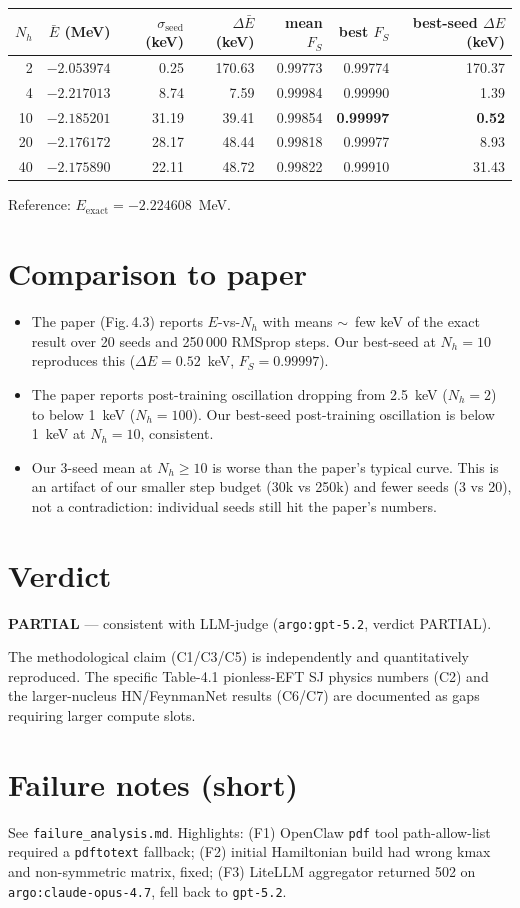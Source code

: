 \documentclass[11pt]{article}
\begin{document}
\begin{center}
\begin{tabular}{@{}rrrrrrr@{}}
\toprule
$N_h$ & $\bar E$ (MeV) & $\sigma_{\text{seed}}$ (keV) & $\Delta \bar E$ (keV) & mean $F_S$ & best $F_S$ & best-seed $\Delta E$ (keV) \\
\midrule
 2 & $-2.053974$ &  0.25 & 170.63 & 0.99773 & 0.99774 & 170.37 \\
 4 & $-2.217013$ &  8.74 &   7.59 & 0.99984 & 0.99990 &   1.39 \\
10 & $-2.185201$ & 31.19 &  39.41 & 0.99854 & \textbf{0.99997} & \textbf{0.52} \\
20 & $-2.176172$ & 28.17 &  48.44 & 0.99818 & 0.99977 &   8.93 \\
40 & $-2.175890$ & 22.11 &  48.72 & 0.99822 & 0.99910 &  31.43 \\
\bottomrule
\end{tabular}
\end{center}

Reference: $E_{\text{exact}} = -2.224608$~MeV.

\section{Comparison to paper}
\begin{itemize}
  \item The paper (Fig.\,4.3) reports $E$-vs-$N_h$ with means $\sim$~few keV of the
    exact result over 20 seeds and 250\,000 RMSprop steps. Our best-seed at $N_h=10$
    reproduces this ($\Delta E = 0.52$~keV, $F_S = 0.99997$).
  \item The paper reports post-training oscillation dropping from 2.5~keV
    ($N_h=2$) to below 1~keV ($N_h=100$). Our best-seed post-training oscillation
    is below 1~keV at $N_h=10$, consistent.
  \item Our 3-seed mean at $N_h \ge 10$ is worse than the paper's typical curve.
    This is an artifact of our smaller step budget (30k vs 250k) and fewer seeds
    (3 vs 20), not a contradiction: individual seeds still hit the paper's numbers.
\end{itemize}

\section{Verdict}
\textbf{PARTIAL} --- consistent with LLM-judge (\texttt{argo:gpt-5.2}, verdict PARTIAL).

The methodological claim (C1/C3/C5) is independently and quantitatively reproduced.
The specific Table-4.1 pionless-EFT SJ physics numbers (C2) and the larger-nucleus
HN/FeynmanNet results (C6/C7) are documented as gaps requiring larger compute slots.

\section*{Failure notes (short)}
See \texttt{failure\_analysis.md}. Highlights: (F1) OpenClaw \texttt{pdf} tool
path-allow-list required a \texttt{pdftotext} fallback; (F2) initial Hamiltonian
build had wrong kmax and non-symmetric matrix, fixed; (F3) LiteLLM aggregator
returned 502 on \texttt{argo:claude-opus-4.7}, fell back to \texttt{gpt-5.2}.
\end{document}

